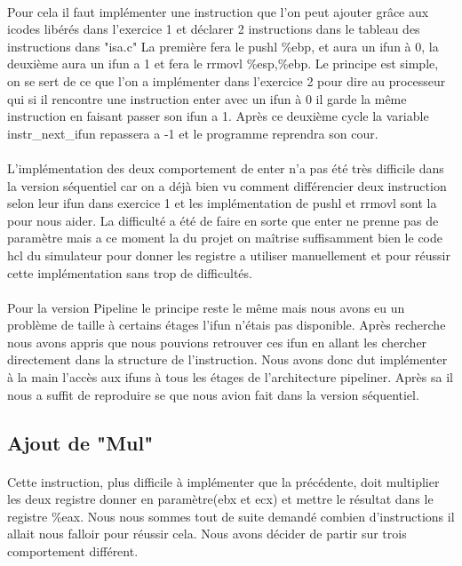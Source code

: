 \documentclass[12pt]{article}
\begin{document}
\paragraph{}Pour cela il faut implémenter une instruction que l'on peut ajouter grâce aux icodes libérés dans l'exercice 1 et déclarer 2 instructions dans le tableau des instructions dans "isa.c" La première fera le pushl \%ebp, et aura un ifun à 0, la deuxième aura un ifun a 1 et fera le rrmovl \%esp,\%ebp. Le principe est simple, on se sert de ce que l'on a implémenter dans l’exercice 2 pour dire au processeur qui si il rencontre une instruction enter avec un ifun à 0 il garde la même instruction en faisant passer son ifun a 1. Après ce deuxième cycle la variable instr\_next\_ifun repassera a -1 et le programme reprendra son cour. 

\paragraph{}L'implémentation des deux comportement de enter n'a pas été très difficile dans la version séquentiel car on a déjà bien vu comment différencier deux instruction selon leur ifun dans exercice 1 et les implémentation de pushl et rrmovl sont la pour nous aider. La difficulté a été de faire en sorte que enter ne prenne pas de paramètre mais a ce moment la du projet on maîtrise suffisamment bien le code hcl du simulateur pour donner les registre a utiliser manuellement et pour réussir cette implémentation sans trop de difficultés.

\paragraph{}Pour la version Pipeline le principe reste le même mais nous avons eu un problème de taille à certains étages l'ifun n'étais pas disponible. Après recherche nous avons appris que nous pouvions retrouver ces ifun en allant les chercher directement dans la structure de l'instruction. Nous avons donc dut implémenter à la main l’accès aux ifuns à tous les étages de l’architecture pipeliner. Après sa il nous a suffit de reproduire se que nous avion fait dans la version séquentiel.

\subsection{Ajout de "Mul"}

\paragraph{} Cette instruction, plus difficile à implémenter que la précédente, doit multiplier les deux registre donner en paramètre(ebx et ecx) et mettre le résultat dans le registre \%eax. Nous nous sommes tout de suite demandé combien d'instructions il allait nous falloir pour réussir cela. Nous avons décider de partir sur trois comportement différent.
\end{document}
